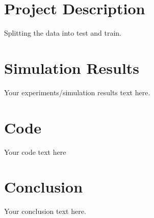 \documentclass{article}
\begin{document}
\section{Project Description}
Splitting the data into test and train.


\section{Simulation Results}
Your experiments/simulation results text here.

\section{Code}
Your code text here

\section{Conclusion}
Your conclusion text here.
\end{document}

